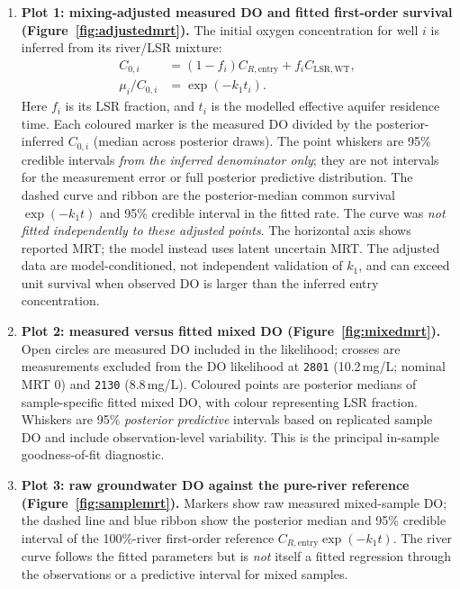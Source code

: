 \documentclass[11pt,a4paper]{article}
\newcommand{\LSR}{\mathrm{LSR}}
\newcommand{\site}[1]{\texttt{#1}}
\begin{document}
\begin{enumerate}[leftmargin=17pt,itemsep=4pt]
\item \textbf{Plot 1: mixing-adjusted measured DO and fitted first-order survival (Figure~\ref{fig:adjustedmrt}).} The initial oxygen concentration for well $i$ is inferred from its river/LSR mixture:
\begin{align}
C_{0,i}&=(1-f_i)C_{R,\mathrm{entry}}+f_i C_{\LSR,\mathrm{WT}},\\
\mu_i/C_{0,i}&=\exp(-k_1t_i).
\end{align}
Here $f_i$ is its LSR fraction, and $t_i$ is the modelled effective aquifer residence time. Each coloured marker is the measured DO divided by the posterior-inferred $C_{0,i}$ (median across posterior draws). The point whiskers are 95\% credible intervals \emph{from the inferred denominator only}; they are not intervals for the measurement error or full posterior predictive distribution. The dashed curve and ribbon are the posterior-median common survival $\exp(-k_1t)$ and 95\% credible interval in the fitted rate. The curve was \emph{not fitted independently to these adjusted points}. The horizontal axis shows reported MRT; the model instead uses latent uncertain MRT. The adjusted data are model-conditioned, not independent validation of $k_1$, and can exceed unit survival when observed DO is larger than the inferred entry concentration.

\item \textbf{Plot 2: measured versus fitted mixed DO (Figure~\ref{fig:mixedmrt}).} Open circles are measured DO included in the likelihood; crosses are measurements excluded from the DO likelihood at \site{2801} (10.2\,mg/L; nominal MRT 0) and \site{2130} (8.8\,mg/L). Coloured points are posterior medians of sample-specific fitted mixed DO, with colour representing LSR fraction. Whiskers are 95\% \emph{posterior predictive} intervals based on replicated sample DO and include observation-level variability. This is the principal in-sample goodness-of-fit diagnostic.

\item \textbf{Plot 3: raw groundwater DO against the pure-river reference (Figure~\ref{fig:samplemrt}).} Markers show raw measured mixed-sample DO; the dashed line and blue ribbon show the posterior median and 95\% credible interval of the 100\%-river first-order reference $C_{R,\mathrm{entry}}\exp(-k_1t)$. The river curve follows the fitted parameters but is \emph{not} itself a fitted regression through the observations or a predictive interval for mixed samples.


\end{enumerate}
\end{document}

